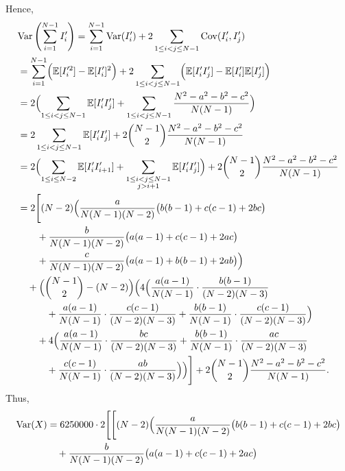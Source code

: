 \documentclass[a4paper,12pt]{article}
\begin{document}
\begin{itemize}
    Hence,
    \begin{align*}
        &\mathrm{Var} \left(\sum_{i=1}^{N-1} I_i'\right) = \sum_{i=1}^{N-1} \mathrm{Var}(I_i') + 2 \sum_{1 \leq i < j \leq N-1} \mathrm{Cov}(I_i', I_j') \\
        &= \sum_{i=1}^{N-1} \Bigl(\mathbb{E}[I_i'^2] - \mathbb{E}[I_i']^2\Bigr) + 2\sum_{1 \leq i < j \leq N-1} \Bigl(\mathbb{E}[I_i'I_j'] - \mathbb{E}[I_i']\mathbb{E}[I_j']\Bigr) \\
        &= 2 \Bigl(\sum_{1 \leq i < j \leq N-1} \mathbb{E}[I_i'I_j']
         + \sum_{1 \leq i < j \leq N-1} \frac{N^2-a^2-b^2-c^2}{N(N-1)}\Bigr) \\
        &= 2 \sum_{1 \leq i < j \leq N-1} \mathbb{E}[I_i'I_j']
         + 2\binom{N-1}{2}\frac{N^2-a^2-b^2-c^2}{N(N-1)} \\
        &= 2 \Bigl(\sum_{1 \leq i \leq N-2}\mathbb{E}[I_i'I_{i+1}']
         + \sum_{\substack{1 \leq i < j \leq N-1 \\ j > i+1}}\mathbb{E}[I_i'I_j']\Bigr) + 2\binom{N-1}{2}\frac{N^2-a^2-b^2-c^2}{N(N-1)} \\
        &= 2\Biggl[(N-2)\Bigl(
            \frac{a}{N(N-1)(N-2)}\bigl(b(b-1)+c(c-1)+2bc\bigr) \\
        &\quad\quad + \frac{b}{N(N-1)(N-2)}\bigl(a(a-1)+c(c-1)+2ac\bigr) \\
        &\quad\quad + \frac{c}{N(N-1)(N-2)}\bigl(a(a-1)+b(b-1)+2ab\bigr)\Bigr) \\
        &\quad + \Bigl(\binom{N-1}{2}-(N-2)\Bigr)\Bigl(
            4\Bigl(
              \frac{a(a-1)}{N(N-1)}\cdot\frac{b(b-1)}{(N-2)(N-3)} \\
        &\qquad\quad + \frac{a(a-1)}{N(N-1)}\cdot\frac{c(c-1)}{(N-2)(N-3)} + \frac{b(b-1)}{N(N-1)}\cdot\frac{c(c-1)}{(N-2)(N-3)}\Bigr) \\
        &\qquad + 4\Bigl(
              \frac{a(a-1)}{N(N-1)}\cdot\frac{bc}{(N-2)(N-3)}
            + \frac{b(b-1)}{N(N-1)}\cdot\frac{ac}{(N-2)(N-3)} \\
        &\qquad\quad + \frac{c(c-1)}{N(N-1)}\cdot\frac{ab}{(N-2)(N-3)}
          \Bigr)\Bigr)\Biggr] + 2 \binom{N - 1}{2} \frac{N^2 - a^2 - b^2 - c^2}{N(N - 1)}.
    \end{align*}
    Thus,
    \begin{align*}
        \mathrm{Var}(X) &= 6250000 \cdot 2 \Biggl[ \Biggl[
          (N-2)\Bigl(
            \frac{a}{N(N-1)(N-2)}\bigl(b(b-1)+c(c-1)+2bc\bigr) \\
        &\quad + \frac{b}{N(N-1)(N-2)}\bigl(a(a-1)+c(c-1)+2ac\bigr) \\

\end{align*}
\end{itemize}
\end{document}
